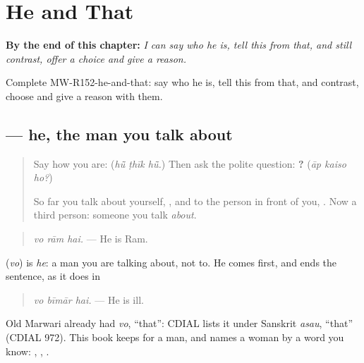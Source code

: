 
\chapter{He and That}
\label{ch:mw-a2-he-and-that}

\begin{chapteropening}
\textbf{By the end of this chapter:} \emph{I can say who he is, tell this from that, and still contrast, offer a choice and give a reason.}

Complete MW-R152-he-and-that: say who he is, tell this from that, and contrast, choose and give a reason with them.
\end{chapteropening}

\section[\texorpdfstring{\mw{वो} (vo)}{वो (vo)}]{ — he, the man you talk about}

\label{lesson:MW-C152-vo}



\begin{quote}
Say how you are: \textbf{  } (\emph{hū̃ ṭhīk hū̃.}) Then ask the polite question: \textbf{  ?} (\emph{āp kaiso ho?})

So far you talk about yourself, \textbf{}, and to the person in front of you, \textbf{}. Now a third person: someone you talk \emph{about}.
\end{quote}

\begin{grammarlens}[title={Grammar Lens: \mw{वो}}]
\begin{quote}
\textbf{  }
\end{quote}

\begin{quote}
\emph{vo rām hai.} — He is Ram.
\end{quote}

\textbf{} (\emph{vo}) is \emph{he}: a man you are talking about, not to. He comes first, and \textbf{} ends the sentence, as it does in \textbf{   }

\begin{quote}
\textbf{  }
\end{quote}

\begin{quote}
\emph{vo bīmār hai.} — He is ill.
\end{quote}

Old Marwari already had \emph{vo}, \textquotedblleft{}that\textquotedblright{}: CDIAL lists it under Sanskrit \emph{asau}, \textquotedblleft{}that\textquotedblright{} (CDIAL 972). This book keeps \textbf{} for a man, and names a woman by a word you know: \textbf{}, \textbf{}, \textbf{}.
\end{grammarlens}

